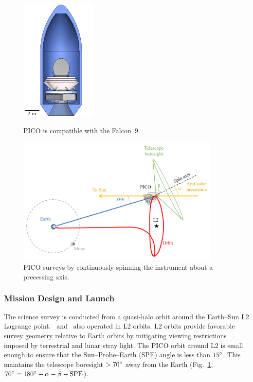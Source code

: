 \begin{figure}[!b]
  \begin{minipage}[b]{0.29\textwidth}
    \begin{center}
    \includegraphics[width=1.5in]{figures/InFairing.JPG}
\caption{\captiontext PICO is compatible with the Falcon~9.\label{fig:InFairing}}
    \end{center}
  \end{minipage}
%
\hfill
\begin{minipage}[b]{0.67\textwidth}
    \begin{center}
    \includegraphics[width=4in]{figures/MissionDesignFigure.png}
\caption{\captiontext
  PICO surveys by continuously spinning the instrument about a
  precessing axis.\label{fig:MissionDesignFigure}}
   \end{center}
  \end{minipage}
\end{figure}

\subsubsection{Mission Design and Launch}
\label{sec:mission_design} %

The science survey is conducted from a quasi-halo orbit around the Earth--Sun L2 Lagrange point. \planck \ and \wmap\ also operated in L2 orbits. L2 orbits provide favorable survey geometry relative to Earth orbits by mitigating viewing restrictions imposed by terrestrial and lunar stray light. The PICO orbit around L2 is small enough to ensure that the Sun--Probe--Earth (SPE) angle is less than $15^\circ$. This maintains the telescope boresight $>70^\circ$ away from the Earth (Fig.~\ref{fig:MissionDesignFigure}, $70^\circ = 180^\circ -\alpha - \beta - \rm{SPE}$).


